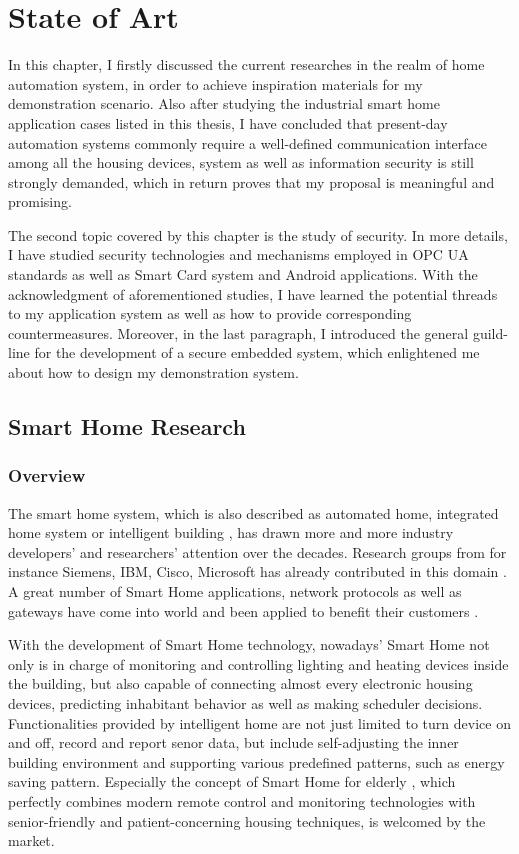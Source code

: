 \chapter{State of Art}
In this chapter, I firstly discussed the current researches in the realm of home automation system, in order to achieve inspiration materials for my demonstration scenario. Also after studying the industrial smart home application cases listed in this thesis, I have concluded that present-day automation systems commonly require a well-defined communication interface among all the housing devices, system as well as information security is still strongly demanded, which in return proves that my proposal is meaningful and promising.  

The second topic covered by this chapter is the study of security. In more details, I have studied security   technologies and mechanisms employed in OPC UA standards as well as Smart Card system and Android applications. With the acknowledgment of aforementioned studies, I have learned the potential threads to my application system as well as how to provide corresponding countermeasures. Moreover, in the last paragraph, I introduced  the general guild-line for the development of a secure embedded system, which enlightened me about how to design my demonstration system.
 
\section{Smart Home Research}
\subsection{Overview}
The smart home system, which is also described as automated home, integrated home system or intelligent building \cite{smart_home_concept}, has drawn more and more industry developers' and researchers' attention over the decades. Research groups from for instance Siemens, IBM, Cisco, Microsoft has already contributed in this domain \cite{smart_home_research}. A great number of Smart Home applications, network protocols as well as gateways have come into world and been applied to benefit their customers \cite{smart_home_for_gateway}.

With the development of Smart Home technology, nowadays' Smart Home not only is in charge of monitoring and controlling lighting and heating devices inside the building, but also capable of connecting almost every electronic housing devices, predicting inhabitant behavior as well as making scheduler decisions. Functionalities provided by intelligent home are not just limited to turn device on and off, record and report senor data, but include self-adjusting the inner building environment and supporting various predefined patterns, such as energy saving pattern. Especially the concept of Smart Home for elderly \cite{smart_home_for_old}, which perfectly combines modern remote control and monitoring technologies with senior-friendly and patient-concerning housing techniques, is welcomed by the market. 

